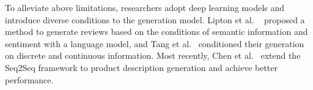 To alleviate above limitations, researchers adopt deep learning models 
and introduce diverse conditions to the generation model. 
Lipton et al. ~\cite{lipton2015capturing} proposed a method to generate reviews 
based on the conditions of semantic information and sentiment with a language model, 
and Tang et al.~\cite{tang2016context} 
conditioned their generation on discrete and continuous information. 
Most recently, Chen et al.~\cite{ChenLZYZ019} extend the Seq2Seq framework
to product description generation and achieve better performance. 


%
